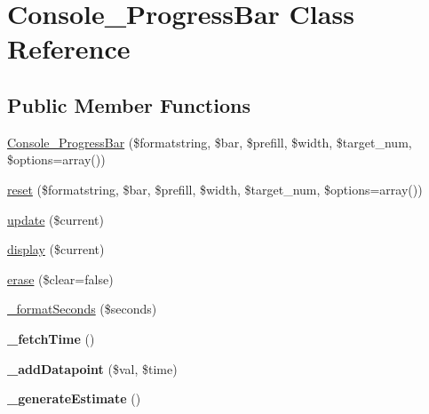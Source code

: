 \hypertarget{class_console___progress_bar}{
\section{Console\_\-ProgressBar Class Reference}
\label{class_console___progress_bar}
}
\subsection*{Public Member Functions}
\begin{DoxyCompactItemize}
\item 
\hyperlink{class_console___progress_bar_a400faa999cbf9bb8ae556c0fad4daf19}{Console\_\-ProgressBar} (\$formatstring, \$bar, \$prefill, \$width, \$target\_\-num, \$options=array())
\item 
\hyperlink{class_console___progress_bar_a49016dd4c5d26bc603e063b219a9f08f}{reset} (\$formatstring, \$bar, \$prefill, \$width, \$target\_\-num, \$options=array())
\item 
\hyperlink{class_console___progress_bar_ad80c69eaa9fce4b141bdef8a23797f94}{update} (\$current)
\item 
\hyperlink{class_console___progress_bar_adaa0477e6435f035779e3ef01c996888}{display} (\$current)
\item 
\hyperlink{class_console___progress_bar_a3927d5a6ecfcb6a7ff26fed3f8384dd3}{erase} (\$clear=false)
\item 
\hyperlink{class_console___progress_bar_ab89825f004b493b43ac9f0dd7ea00891}{\_\-formatSeconds} (\$seconds)
\item 
\hypertarget{class_console___progress_bar_a46ef98510914060d8a3794093d81dec5}{
{\bfseries \_\-fetchTime} ()}
\label{class_console___progress_bar_a46ef98510914060d8a3794093d81dec5}

\item 
\hypertarget{class_console___progress_bar_a492e03043bd142c9dea33274a0d46c11}{
{\bfseries \_\-addDatapoint} (\$val, \$time)}
\label{class_console___progress_bar_a492e03043bd142c9dea33274a0d46c11}

\item 
\hypertarget{class_console___progress_bar_a06ecbbd4342fce018db5c66473ff53ef}{
{\bfseries \_\-generateEstimate} ()}
\label{class_console___progress_bar_a06ecbbd4342fce018db5c66473ff53ef}

\end{DoxyCompactItemize}
